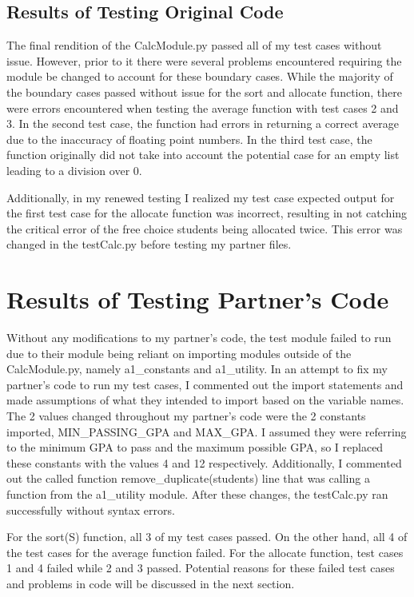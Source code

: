 \documentclass[12pt]{article}
\begin{document}
\newpage

\subsection{Results of Testing Original Code}

The final rendition of the CalcModule.py passed all of my test cases without issue. However, prior to it there were several problems encountered requiring the module be changed to account for these boundary cases. While the majority of the boundary cases passed without issue for the sort and allocate function, there were errors encountered when testing the average function with test cases 2 and 3. In the second test case, the function had errors in returning a correct average due to the inaccuracy of floating point numbers. In the third test case, the function originally did not take into account the potential case for an empty list leading to a division over 0. 

Additionally, in my renewed testing I realized my test case expected output for the first test case for the allocate function was incorrect, resulting in not catching the critical error of the free choice students being allocated twice. This error was changed in the testCalc.py before testing my partner files. 


\section{Results of Testing Partner's Code}

Without any modifications to my partner's code, the test module failed to run due to their module being reliant on importing modules outside of the CalcModule.py, namely a1\_constants and a1\_utility. In an attempt to fix my partner's code to run my test cases, I commented out the import statements and made assumptions of what they intended to import based on the variable names. The 2 values changed throughout my partner's code were the 2 constants imported, MIN\_PASSING\_GPA and MAX\_GPA. I assumed they were referring to the minimum GPA to pass and the maximum possible GPA, so I replaced these constants with the values 4 and 12 respectively. Additionally, I commented out the called function remove\_duplicate(students) line that was calling a function from the a1\_utility module. After these changes, the testCalc.py ran successfully without syntax errors.

For the sort(S) function, all 3 of my test cases passed. On the other hand, all 4 of the test cases for the average function failed. For the allocate function, test cases 1 and 4 failed while 2 and 3 passed. Potential reasons for these failed test cases and problems in code will be discussed in the next section.
\end{document}
